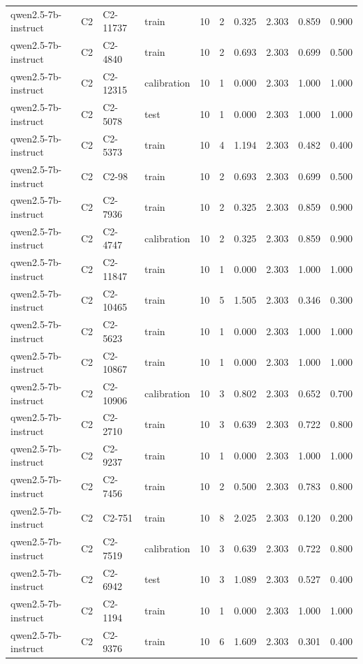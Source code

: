 \begin{table}
\begin{tabular}{llllrrrrrr}
qwen2.5-7b-instruct & C2 & C2-11737 & train & 10 & 2 & 0.325 & 2.303 & 0.859 & 0.900 \\
qwen2.5-7b-instruct & C2 & C2-4840 & train & 10 & 2 & 0.693 & 2.303 & 0.699 & 0.500 \\
qwen2.5-7b-instruct & C2 & C2-12315 & calibration & 10 & 1 & 0.000 & 2.303 & 1.000 & 1.000 \\
qwen2.5-7b-instruct & C2 & C2-5078 & test & 10 & 1 & 0.000 & 2.303 & 1.000 & 1.000 \\
qwen2.5-7b-instruct & C2 & C2-5373 & train & 10 & 4 & 1.194 & 2.303 & 0.482 & 0.400 \\
qwen2.5-7b-instruct & C2 & C2-98 & train & 10 & 2 & 0.693 & 2.303 & 0.699 & 0.500 \\
qwen2.5-7b-instruct & C2 & C2-7936 & train & 10 & 2 & 0.325 & 2.303 & 0.859 & 0.900 \\
qwen2.5-7b-instruct & C2 & C2-4747 & calibration & 10 & 2 & 0.325 & 2.303 & 0.859 & 0.900 \\
qwen2.5-7b-instruct & C2 & C2-11847 & train & 10 & 1 & 0.000 & 2.303 & 1.000 & 1.000 \\
qwen2.5-7b-instruct & C2 & C2-10465 & train & 10 & 5 & 1.505 & 2.303 & 0.346 & 0.300 \\
qwen2.5-7b-instruct & C2 & C2-5623 & train & 10 & 1 & 0.000 & 2.303 & 1.000 & 1.000 \\
qwen2.5-7b-instruct & C2 & C2-10867 & train & 10 & 1 & 0.000 & 2.303 & 1.000 & 1.000 \\
qwen2.5-7b-instruct & C2 & C2-10906 & calibration & 10 & 3 & 0.802 & 2.303 & 0.652 & 0.700 \\
qwen2.5-7b-instruct & C2 & C2-2710 & train & 10 & 3 & 0.639 & 2.303 & 0.722 & 0.800 \\
qwen2.5-7b-instruct & C2 & C2-9237 & train & 10 & 1 & 0.000 & 2.303 & 1.000 & 1.000 \\
qwen2.5-7b-instruct & C2 & C2-7456 & train & 10 & 2 & 0.500 & 2.303 & 0.783 & 0.800 \\
qwen2.5-7b-instruct & C2 & C2-751 & train & 10 & 8 & 2.025 & 2.303 & 0.120 & 0.200 \\
qwen2.5-7b-instruct & C2 & C2-7519 & calibration & 10 & 3 & 0.639 & 2.303 & 0.722 & 0.800 \\
qwen2.5-7b-instruct & C2 & C2-6942 & test & 10 & 3 & 1.089 & 2.303 & 0.527 & 0.400 \\
qwen2.5-7b-instruct & C2 & C2-1194 & train & 10 & 1 & 0.000 & 2.303 & 1.000 & 1.000 \\
qwen2.5-7b-instruct & C2 & C2-9376 & train & 10 & 6 & 1.609 & 2.303 & 0.301 & 0.400 \\

\end{tabular}
\end{table}
